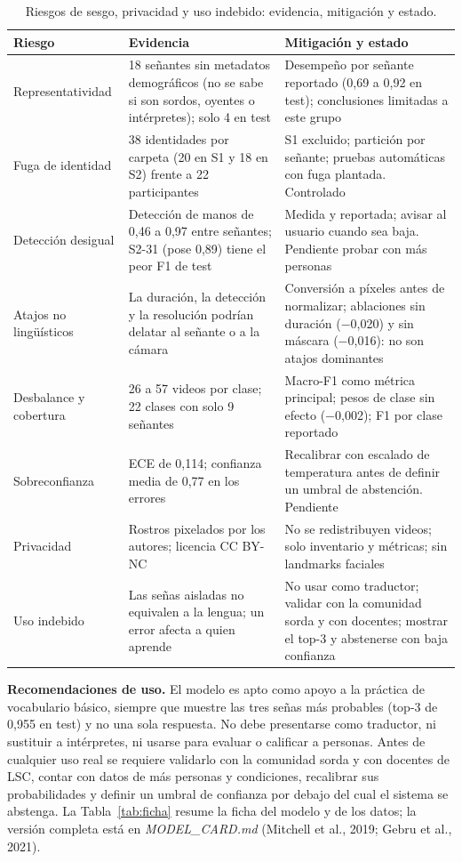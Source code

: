 \documentclass[11pt,a4paper]{article}
\newcommand{\code}[1]{\textit{#1}}
\begin{document}
\begin{table}[htbp]
\centering
\caption{Riesgos de sesgo, privacidad y uso indebido: evidencia, mitigación y estado.}\label{tab:riesgos}
\small
\renewcommand{\arraystretch}{1.15}
\begin{tabularx}{\textwidth}{@{}>{\raggedright\arraybackslash}p{2.6cm}YY@{}}
\toprule
\textbf{Riesgo} & \textbf{Evidencia} & \textbf{Mitigación y estado}\\
\midrule
Representatividad & 18 señantes sin metadatos demográficos (no se sabe si son sordos, oyentes o intérpretes); solo 4 en test & Desempeño por señante reportado (0,69 a 0,92 en test); conclusiones limitadas a este grupo\\
Fuga de identidad & 38 identidades por carpeta (20 en S1 y 18 en S2) frente a 22 participantes & S1 excluido; partición por señante; pruebas automáticas con fuga plantada. Controlado\\
Detección desigual & Detección de manos de 0,46 a 0,97 entre señantes; S2-31 (pose 0,89) tiene el peor F1 de test & Medida y reportada; avisar al usuario cuando sea baja. Pendiente probar con más personas\\
Atajos no lingüísticos & La duración, la detección y la resolución podrían delatar al señante o a la cámara & Conversión a píxeles antes de normalizar; ablaciones sin duración ($-$0,020) y sin máscara ($-$0,016): no son atajos dominantes\\
Desbalance y cobertura & 26 a 57 videos por clase; 22 clases con solo 9 señantes & Macro-F1 como métrica principal; pesos de clase sin efecto ($-$0,002); F1 por clase reportado\\
Sobreconfianza & ECE de 0,114; confianza media de 0,77 en los errores & Recalibrar con escalado de temperatura antes de definir un umbral de abstención. Pendiente\\
Privacidad & Rostros pixelados por los autores; licencia CC BY-NC & No se redistribuyen videos; solo inventario y métricas; sin landmarks faciales\\
Uso indebido & Las señas aisladas no equivalen a la lengua; un error afecta a quien aprende & No usar como traductor; validar con la comunidad sorda y con docentes; mostrar el top-3 y abstenerse con baja confianza\\
\bottomrule
\end{tabularx}
\end{table}

\textbf{Recomendaciones de uso.} El modelo es apto como apoyo a la práctica de vocabulario básico, siempre que muestre las tres señas más probables (top-3 de 0,955 en test) y no una sola respuesta. No debe presentarse como traductor, ni sustituir a intérpretes, ni usarse para evaluar o calificar a personas. Antes de cualquier uso real se requiere validarlo con la comunidad sorda y con docentes de LSC, contar con datos de más personas y condiciones, recalibrar sus probabilidades y definir un umbral de confianza por debajo del cual el sistema se abstenga. La Tabla~\ref{tab:ficha} resume la ficha del modelo y de los datos; la versión completa está en \code{MODEL\_CARD.md} (Mitchell et al., 2019; Gebru et al., 2021).
\end{document}
